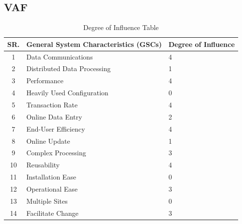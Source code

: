 \documentclass[11pt]{article}
\begin{document}
\subsection{VAF}
\begin{table}[H]
    \centering
    \begin{tabular}{|c|p{5cm}|p{3cm}|}
        \hline
        \textbf{SR.} & \textbf{General System Characteristics (GSCs)} & \textbf{Degree of Influence} \\\hline
        1            & Data Communications                            & 4                            \\\hline
        2            & Distributed Data Processing                    & 1                            \\\hline
        3            & Performance                                    & 4                            \\\hline
        4            & Heavily Used Configuration                     & 0                            \\\hline
        5            & Transaction Rate                               & 4                            \\\hline
        6            & Online Data Entry                              & 2                            \\\hline
        7            & End-User Efficiency                            & 4                            \\\hline
        8            & Online Update                                  & 1                            \\\hline
        9            & Complex Processing                             & 3                            \\\hline
        10           & Reusability                                    & 4                            \\\hline
        11           & Installation Ease                              & 0                            \\\hline
        12           & Operational Ease                               & 3                            \\\hline
        13           & Multiple Sites                                 & 0                            \\\hline
        14           & Facilitate Change                              & 3                            \\\hline
    \end{tabular}
    \caption{Degree of Influence Table}
\end{table}
\end{document}
